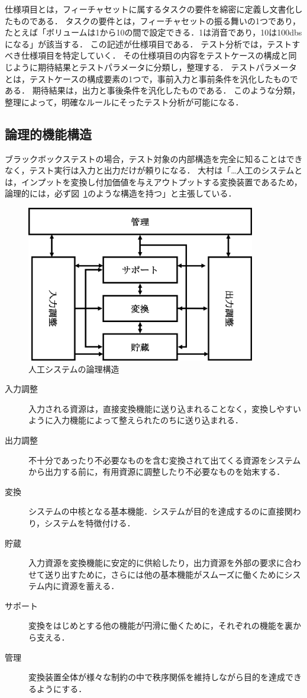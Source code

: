 仕様項目とは，フィーチャセットに属するタスクの要件を綿密に定義し文書化したものである．
タスクの要件とは，フィーチャセットの振る舞いの1つであり，たとえば「ボリュームは1から10の間で設定できる．1は消音であり，10は100dbsになる」が該当する．
この記述が仕様項目である．
テスト分析では，テストすべき仕様項目を特定していく．
その仕様項目の内容をテストケースの構成と同じように期待結果とテストパラメータに分類し，整理する．
テストパラメータとは，テストケースの構成要素の1つで，事前入力と事前条件を汎化したものである．
期待結果は，出力と事後条件を汎化したものである．
このような分類，整理によって，明確なルールにそったテスト分析が可能になる．

\subsection{論理的機能構造}
ブラックボックステストの場合，テスト対象の内部構造を完全に知ることはできなく，テスト実行は入力と出力だけが頼りになる．
大村は「…人工のシステムとは，インプットを変換し付加価値を与えアウトプットする変換装置であるため，論理的には，必ず図~\ref{fig:D-2-FigLSOF1}のような構造を持つ\cite{LSOF}」と主張している．
\begin{figure}[htbp]
  \begin{center}
	\includegraphics[width=10cm]{./image/D-2-FigLSOF.png}
	\caption{人工システムの論理構造}
	\label{fig:D-2-FigLSOF1}
  \end{center}
\end{figure}

\begin{description}
  \item[入力調整]入力される資源は，直接変換機能に送り込まれることなく，変換しやすいように入力機能によって整えられたのちに送り込まれる．
  \item[出力調整]不十分であったり不必要なものを含む変換されて出てくる資源をシステムから出力する前に，有用資源に調整したり不必要なものを始末する．
  \item[変換]システムの中核となる基本機能．システムが目的を達成するのに直接関わり，システムを特徴付ける．
  \item[貯蔵]入力資源を変換機能に安定的に供給したり，出力資源を外部の要求に合わせて送り出すために，さらには他の基本機能がスムーズに働くためにシステム内に資源を蓄える．
  \item[サポート]変換をはじめとする他の機能が円滑に働くために，それぞれの機能を裏から支える．
  \item[管理]変換装置全体が様々な制約の中で秩序関係を維持しながら目的を達成できるようにする．
\end{description}


